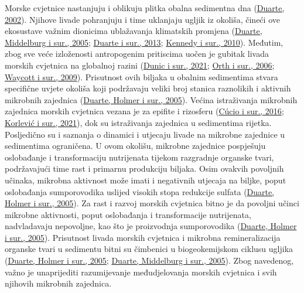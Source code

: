 \documentclass[
  12 pt,
]{book}
\begin{document}
{Morske cvjetnice nastanjuju i oblikuju plitka obalna sedimentna dna (\protect\hyperlink{ref-Duarte2002}{Duarte, 2002}). Njihove livade pohranjuju i time uklanjaju ugljik iz okoliša, čineći ove ekosustave važnim dionicima ublažavanja klimatskih promjena (\protect\hyperlink{ref-Duarte2005a}{Duarte, Middelburg i sur., 2005}; \protect\hyperlink{ref-Duarte2013}{Duarte i sur., 2013}; \protect\hyperlink{ref-Kennedy2010}{Kennedy i sur., 2010}). Međutim, zbog sve veće izloženosti antropogenim pritiscima uočen je gubitak livada morskih cvjetnica na globalnoj razini (\protect\hyperlink{ref-Dunic2021}{Dunic i sur., 2021}; \protect\hyperlink{ref-Orth2006}{Orth i sur., 2006}; \protect\hyperlink{ref-Waycott2009}{Waycott i sur., 2009}). Prisutnost ovih biljaka u obalnim sedimentima stvara specifične uvjete okoliša koji podržavaju veliki broj stanica raznolikih i aktivnih mikrobnih zajednica (\protect\hyperlink{ref-Duarte2005}{Duarte, Holmer i sur., 2005}). Većina istraživanja mikrobnih zajednica morskih cvjetnica vezana je za epifite i rizosferu (\protect\hyperlink{ref-Cucio2016}{Cúcio i sur., 2016}; \protect\hyperlink{ref-Korlevic2021}{Korlević i sur., 2021}), dok su istraživanja zajednica u sedimentima rijetka. Posljedično su i saznanja o dinamici i utjecaju livade na mikrobne zajednice u sedimentima ograničena. U ovom okolišu, mikrobne zajednice pospješuju oslobađanje i transformaciju nutrijenata tijekom razgradnje organske tvari, podržavajući time rast i primarnu produkciju biljaka. Osim ovakvih povoljnih učinaka, mikrobna aktivnost može imati i negativnih utjecaja na biljke, poput oslobađanja sumporovodika uslijed visokih stopa redukcije sulfata (\protect\hyperlink{ref-Duarte2005}{Duarte, Holmer i sur., 2005}). Za rast i razvoj morskih cvjetnica bitno je da povoljni učinci mikrobne aktivnosti, poput oslobađanja i transformacije nutrijenata, nadvladavaju nepovoljne, kao što je proizvodnja sumporovodika (\protect\hyperlink{ref-Duarte2005}{Duarte, Holmer i sur., 2005}). Prisutnost livada morskih cvjetnica i mikrobna remineralizacija organske tvari u sedimentu bitni su čimbenici u biogeokemijskom ciklusu ugljika (\protect\hyperlink{ref-Duarte2005}{Duarte, Holmer i sur., 2005}; \protect\hyperlink{ref-Duarte2005a}{Duarte, Middelburg i sur., 2005}). Zbog navedenog, važno je unaprijediti razumijevanje međudjelovanja morskih cvjetnica i svih njihovih mikrobnih zajednica.

}
\end{document}
